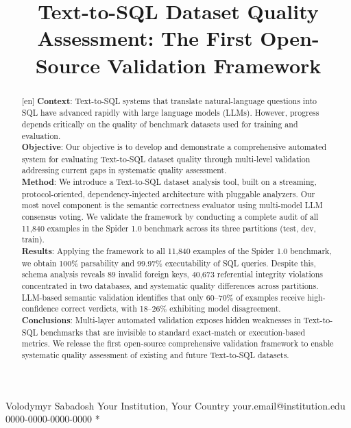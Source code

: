 \documentclass[]{einformatica}
\begin{document}
\title{Text-to-SQL Dataset Quality Assessment: The First Open-Source Validation Framework}



\EIauthorI
   {Volodymyr}
   {Sabadosh}
   {Your Institution, Your Country}
   {your.email@institution.edu}
   {0000-0000-0000-0000} %
   {*} %

 

\begin{abstract}[en]
\textbf{Context}: 
Text-to-SQL systems that translate natural-language questions into SQL have advanced rapidly with large language models (LLMs). However, progress depends critically on the quality of benchmark datasets used for training and evaluation. \\
\textbf{Objective}: 
Our objective is to develop and demonstrate a comprehensive automated system for evaluating Text-to-SQL dataset quality through multi-level validation addressing current gaps in systematic quality assessment. \\
\textbf{Method}: 
We introduce a Text-to-SQL dataset analysis tool, built on a streaming, protocol-oriented, dependency-injected architecture with pluggable analyzers. Our most novel component is the semantic correctness evaluator using multi-model LLM consensus voting. We validate the framework by conducting a complete audit of all 11,840 examples in the Spider 1.0 benchmark across its three partitions (test, dev, train). \\
\textbf{Results}: 
Applying the framework to all 11,840 examples of the Spider 1.0 benchmark, we obtain 100\% parsability and 99.97\% executability of SQL queries. Despite this, schema analysis reveals 89 invalid foreign keys, 40,673 referential integrity violations concentrated in two databases, and systematic quality differences across partitions. LLM-based semantic validation identifies that only 60--70\% of examples receive high-confidence correct verdicts, with 18--26\% exhibiting model disagreement. \\
\textbf{Conclusions}: 
Multi-layer automated validation exposes hidden weaknesses in Text-to-SQL benchmarks that are invisible to standard exact-match or execution-based metrics. We release the first open-source comprehensive validation framework to enable systematic quality assessment of existing and future Text-to-SQL datasets.
\end{abstract}
\end{document}
